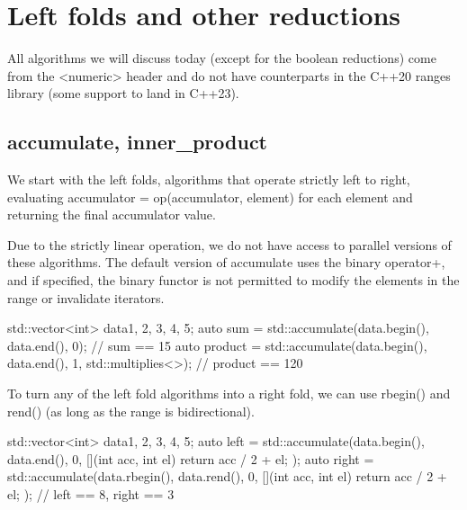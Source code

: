 \section{Left folds and other reductions}

All algorithms we will discuss today (except for the boolean reductions) come from the <numeric> header and do not have counterparts in the C++20 ranges library (some support to land in C++23).

\subsection{accumulate, inner\_product}

We start with the left folds, algorithms that operate strictly left to right, evaluating accumulator = op(accumulator, element) for each element and returning the final accumulator value.



Due to the strictly linear operation, we do not have access to parallel versions of these algorithms. The default version of accumulate uses the binary operator+, and if specified, the binary functor is not permitted to modify the elements in the range or invalidate iterators.

\begin{box-note}
\begin{cppcode}
std::vector<int> data{1, 2, 3, 4, 5};
auto sum = std::accumulate(data.begin(), data.end(), 0);
// sum == 15
auto product = std::accumulate(data.begin(), data.end(), 1, std::multiplies<>{});
// product == 120
\end{cppcode}
\end{box-note}

To turn any of the left fold algorithms into a right fold, we can use rbegin() and rend() (as long as the range is bidirectional).

\begin{box-note}
\begin{cppcode}
std::vector<int> data{1, 2, 3, 4, 5};
auto left = std::accumulate(data.begin(), data.end(), 0, [](int acc, int el) {
    return acc / 2 + el;
});
auto right = std::accumulate(data.rbegin(), data.rend(), 0, [](int acc, int el) {
    return acc / 2 + el;
});
// left == 8, right == 3
\end{cppcode}
\end{box-note}

